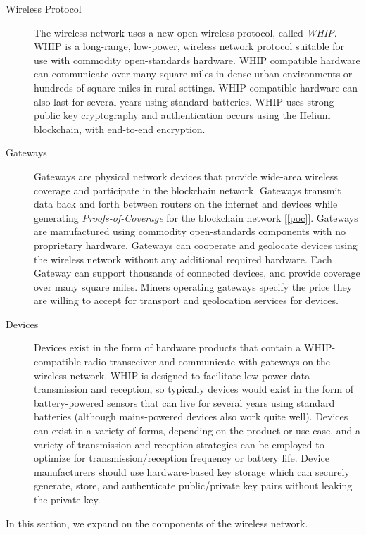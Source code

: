 \documentclass[letterpaper,11pt]{article}
\begin{document}
\begin{description}
        \item [Wireless Protocol] The wireless network uses a new open wireless protocol, called \emph{WHIP}. WHIP is a long-range, low-power, wireless network protocol suitable for use with commodity open-standards hardware. WHIP compatible hardware can communicate over many square miles in dense urban environments or hundreds of square miles in rural settings. WHIP compatible hardware can also last for several years using standard batteries. WHIP uses strong public key cryptography and authentication occurs using the Helium blockchain, with end-to-end encryption.

        \item [Gateways] Gateways are physical network devices that provide wide-area wireless coverage and participate in the blockchain network. Gateways transmit data back and forth between routers on the internet and devices while generating \emph{Proofs-of-Coverage} for the blockchain network [\ref{poc}]. Gateways are manufactured using commodity open-standards components with no proprietary hardware. Gateways can cooperate and geolocate devices using the wireless network without any additional required hardware. Each Gateway can support thousands of connected devices, and provide coverage over many square miles. Miners operating gateways specify the price they are willing to accept for transport and geolocation services for devices.

        \item [Devices] Devices exist in the form of hardware products that contain a WHIP-compatible radio transceiver and communicate with gateways on the wireless network. WHIP is designed to facilitate low power data transmission and reception, so typically devices would exist in the form of battery-powered sensors that can live for several years using standard batteries (although mains-powered devices also work quite well). Devices can exist in a variety of forms, depending on the product or use case, and a variety of transmission and reception strategies can be employed to optimize for transmission/reception frequency or battery life. Device manufacturers should use hardware-based key storage which can securely generate, store, and authenticate public/private key pairs without leaking the private key.
\end{description}

In this section, we expand on the components of the wireless network.
\end{document}
